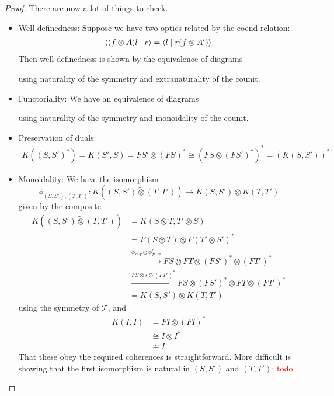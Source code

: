 \documentclass[11pt,letterpaper]{article}
\theoremstyle{plain}
\theoremstyle{definition}
\newcommand{\T}{\mathscr{T}}
\newcommand{\switched}{\mathbin{\tilde{\otimes}}}
\newcommand{\rep}[2]{{\ensuremath \left\langle #1 \mid #2 \right\rangle}}
\newcommand{\todo}[1]{\textcolor{red}{\small #1}}
\begin{document}
\begin{proof}
There are now a lot of things to check.
\begin{itemize}
\item Well-definedness: Suppose we have two optics related by the coend relation:
  \begin{align*}
    \rep{(f \otimes A) l}{r} = \rep{l}{r (f \otimes A')}
  \end{align*}
  Then well-definedness is shown by the equivalence of diagrams
  \begin{center}
    
    \qquad \raisebox{1.5cm}{$=$} \qquad
    
  \end{center}
  using naturality of the symmetry and extranaturality of the counit.
\item Functoriality: We have an equivalence of diagrams
  \begin{center}
    
    \quad \raisebox{1.5cm}{$=$} \quad
    
  \end{center}
using naturality of the symmetry and monoidality of the counit.
\item Preservation of duals:
\begin{align*}
K({(S, S')}^*)
= K(S', S)
= FS' \otimes {(FS)}^*
\cong {(FS \otimes {(FS')}^*)}^*
= {(K(S, S'))}^*
\end{align*}
\item Monoidality: We have the isomorphism \[ \phi_{(S, S'),(T, T')} : K((S, S') \switched (T, T')) \to K(S, S') \otimes K(T, T')\] given by the composite
\begin{align*}
K((S, S') \switched (T, T'))
&= K(S \otimes T, T' \otimes S) \\
&= F(S \otimes T) \otimes {F(T' \otimes S')}^* \\
&\xrightarrow{\phi_{S, T} \otimes \phi_{T', S'}^*} FS \otimes FT \otimes {(FS')}^* \otimes {(FT')}^* \\
&\xrightarrow{FS \otimes s \otimes {(FT')}^*} FS \otimes {(FS')}^* \otimes FT \otimes {(FT')}^* \\
&= K(S, S') \otimes K(T, T')
\end{align*}
using the symmetry of $\T$, and
\begin{align*}
K(I, I)
&= FI \otimes {(FI)}^* \\
&\cong I \otimes I^* \\
&\cong I
\end{align*}
That these obey the required coherences is straightforward. More difficult is showing that the first isomorphism is natural in $(S, S')$ and $(T, T')$: \todo{todo}

\end{itemize}
\end{proof}
\end{document}
